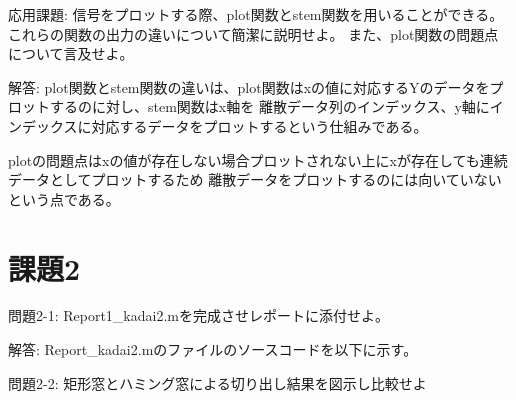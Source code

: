 \documentclass[a4paper,11pt]{ltjsarticle}
\begin{document}
応用課題:
信号をプロットする際、plot関数とstem関数を用いることができる。これらの関数の出力の違いについて簡潔に説明せよ。
また、plot関数の問題点について言及せよ。

解答:
plot関数とstem関数の違いは、plot関数はxの値に対応するYのデータをプロットするのに対し、stem関数はx軸を
離散データ列のインデックス、y軸にインデックスに対応するデータをプロットするという仕組みである。

plotの問題点はxの値が存在しない場合プロットされない上にxが存在しても連続データとしてプロットするため
離散データをプロットするのには向いていないという点である。

\newpage

\section{課題2}
問題2-1:
Report1\_kadai2.mを完成させレポートに添付せよ。

解答:
Report\_kadai2.mのファイルのソースコードを以下に示す。


問題2-2:
矩形窓とハミング窓による切り出し結果を図示し比較せよ
\end{document}
